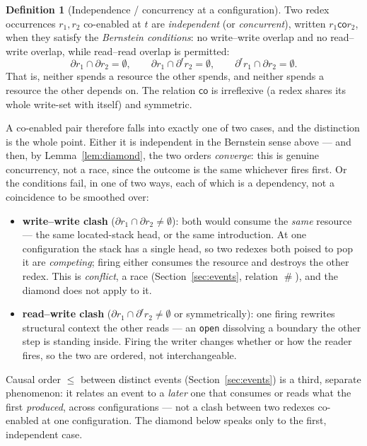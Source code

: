 \documentclass[11pt]{article}
\theoremstyle{definition}
\newtheorem{definition}{Definition}[section]
\theoremstyle{plain}
\newcommand{\foot}{\partial}                       %
\newcommand{\rfoot}{\partial^{\mathsf r}}          %
\newcommand{\co}{\mathbin{\mathsf{co}}}            %
\newcommand{\confl}{\mathrel{\#}}                  %
\theoremstyle{remark}
\begin{document}
\begin{definition}[Independence / concurrency at a configuration]
\label{def:independent}
Two redex occurrences $r_1, r_2$ co-enabled at $t$ are \emph{independent}
(or \emph{concurrent}), written $r_1 \co r_2$, when they satisfy the
\emph{Bernstein conditions}: no write--write overlap and no read--write
overlap, while read--read overlap is permitted:
\[
  \foot r_1 \cap \foot r_2 = \emptyset,
  \qquad
  \foot r_1 \cap \rfoot r_2 = \emptyset,
  \qquad
  \rfoot r_1 \cap \foot r_2 = \emptyset.
\]
That is, neither spends a resource the other spends, and neither spends a
resource the other depends on. The relation $\co$ is irreflexive (a redex
shares its whole write-set with itself) and symmetric.
\end{definition}

A co-enabled pair therefore falls into exactly one of two cases, and the
distinction is the whole point. Either it is independent in the Bernstein
sense above --- and then, by Lemma~\ref{lem:diamond}, the two orders
\emph{converge}: this is genuine concurrency, not a race, since the
outcome is the same whichever fires first. Or the conditions fail, in one
of two ways, each of which is a dependency, not a coincidence to be
smoothed over:
\begin{itemize}[leftmargin=1.6em,itemsep=2pt,topsep=2pt]
  \item \textbf{write--write clash} ($\foot r_1 \cap \foot r_2 \neq
  \emptyset$): both would consume the \emph{same} resource --- the same
  located-stack head, or the same introduction. At one configuration the
  stack has a single head, so two redexes both poised to pop it are
  \emph{competing}; firing either consumes the resource and destroys the
  other redex. This is \emph{conflict}, a race (Section~\ref{sec:events},
  relation $\confl$), and the diamond does not apply to it.
  \item \textbf{read--write clash} ($\foot r_1 \cap \rfoot r_2 \neq
  \emptyset$ or symmetrically): one firing rewrites structural context the
  other reads --- an \texttt{open} dissolving a boundary the other step is
  standing inside. Firing the writer changes whether or how the reader
  fires, so the two are ordered, not interchangeable.
\end{itemize}
Causal order $\le$ between distinct events
(Section~\ref{sec:events}) is a third, separate phenomenon: it relates an
event to a \emph{later} one that consumes or reads what the first
\emph{produced}, across configurations --- not a clash between two redexes
co-enabled at one configuration. The diamond below speaks only to the
first, independent case.
\end{document}
